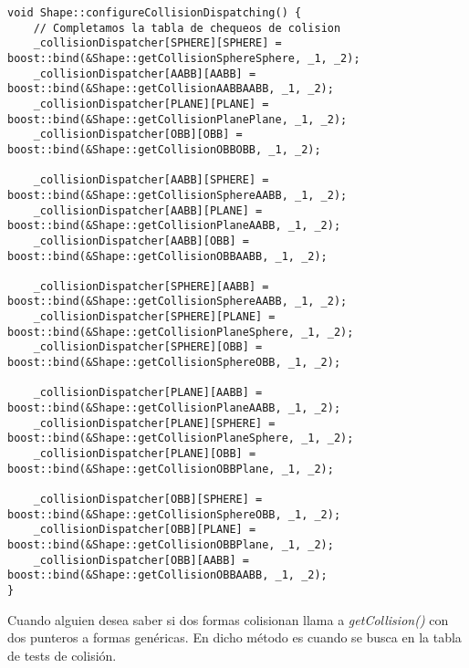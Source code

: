 \begin{lstlisting}[style=C++]
void Shape::configureCollisionDispatching() {
    // Completamos la tabla de chequeos de colision
    _collisionDispatcher[SPHERE][SPHERE] = boost::bind(&Shape::getCollisionSphereSphere, _1, _2);
    _collisionDispatcher[AABB][AABB] = boost::bind(&Shape::getCollisionAABBAABB, _1, _2);
    _collisionDispatcher[PLANE][PLANE] = boost::bind(&Shape::getCollisionPlanePlane, _1, _2);
    _collisionDispatcher[OBB][OBB] = boost::bind(&Shape::getCollisionOBBOBB, _1, _2);

    _collisionDispatcher[AABB][SPHERE] = boost::bind(&Shape::getCollisionSphereAABB, _1, _2);
    _collisionDispatcher[AABB][PLANE] = boost::bind(&Shape::getCollisionPlaneAABB, _1, _2);
    _collisionDispatcher[AABB][OBB] = boost::bind(&Shape::getCollisionOBBAABB, _1, _2);

    _collisionDispatcher[SPHERE][AABB] = boost::bind(&Shape::getCollisionSphereAABB, _1, _2);
    _collisionDispatcher[SPHERE][PLANE] = boost::bind(&Shape::getCollisionPlaneSphere, _1, _2);
    _collisionDispatcher[SPHERE][OBB] = boost::bind(&Shape::getCollisionSphereOBB, _1, _2);

    _collisionDispatcher[PLANE][AABB] = boost::bind(&Shape::getCollisionPlaneAABB, _1, _2);
    _collisionDispatcher[PLANE][SPHERE] = boost::bind(&Shape::getCollisionPlaneSphere, _1, _2);
    _collisionDispatcher[PLANE][OBB] = boost::bind(&Shape::getCollisionOBBPlane, _1, _2);
    
    _collisionDispatcher[OBB][SPHERE] = boost::bind(&Shape::getCollisionSphereOBB, _1, _2);
    _collisionDispatcher[OBB][PLANE] = boost::bind(&Shape::getCollisionOBBPlane, _1, _2);
    _collisionDispatcher[OBB][AABB] = boost::bind(&Shape::getCollisionOBBAABB, _1, _2);
}
\end{lstlisting}

Cuando alguien desea saber si dos formas colisionan llama a \textit{getCollision()}
con dos punteros a formas genéricas. En dicho método es cuando se busca
en la tabla de tests de colisión.\\

